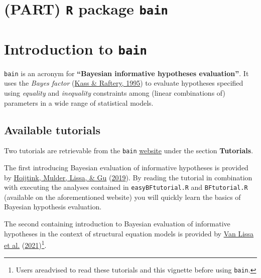 \documentclass[
]{book}
\begin{document}
\hypertarget{part-r-package-bain}{%
\chapter*{\texorpdfstring{(PART) \texttt{R} package \texttt{bain}}{(PART) R package bain}}\label{part-r-package-bain}}

\hypertarget{introduction-to-bain}{%
\chapter*{\texorpdfstring{Introduction to \texttt{bain}}{Introduction to bain}}\label{introduction-to-bain}}

\texttt{bain} is an acronym for \textbf{``Bayesian informative hypotheses evaluation''}.
It uses the \emph{Bayes factor} (\protect\hyperlink{ref-kass1995bayes}{Kass \& Raftery, 1995}) to evaluate hypotheses specified using \emph{equality} and \emph{inequality} constraints among (linear combinations of) parameters in a wide range of statistical models.

\hypertarget{available-tutorials}{%
\section{Available tutorials}\label{available-tutorials}}

Two tutorials are retrievable from the \texttt{bain} \href{https://informative-hypotheses.sites.uu.nl/software/bain/}{website} under the section \textbf{Tutorials}.

The first introducing Bayesian evaluation of informative hypotheses is provided by \protect\hyperlink{ref-hoijtink2019tutorial}{Hoijtink, Mulder, Lissa, \& Gu} (\protect\hyperlink{ref-hoijtink2019tutorial}{2019}). By reading the tutorial in combination with executing the analyses contained in \texttt{easyBFtutorial.R} and \texttt{BFtutorial.R} (available on the aforementioned website) you will quickly learn the basics of Bayesian hypothesis evaluation.

The second containing introduction to Bayesian evaluation of informative hypotheses in the context of structural equation models is provided by \protect\hyperlink{ref-van2021teacher}{Van Lissa et al.} (\protect\hyperlink{ref-van2021teacher}{2021})\footnote{Users areadvised to read these tutorials and this vignette before using \texttt{bain}.}.
\end{document}
